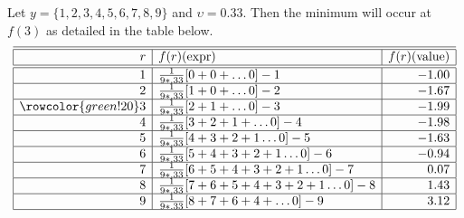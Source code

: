 Let $y =\{1,2,3,4,5,6,7,8,9\}$ and  $\upsilon = 0.33$. Then the minimum will occur at $f(3)$ as detailed in
the table below.
\[
\begin{array}{|r|l|r|}  \hline \hline
r & f(r) (\mbox{expr}) & f(r) (\mbox{value}) \\ \hline \hline
1 & \frac{1}{9*.33}[0 + 0 +\ldots 0] - 1 & -1.00 \\ \hline
2 & \frac{1}{9*.33}[1 + 0 +\ldots 0] - 2 & -1.67 \\ \hline
\rowcolor{green!20}
3 & \frac{1}{9*.33}[2 + 1 +\ldots 0] - 3 & -1.99  \\ \hline
4 & \frac{1}{9*.33}[3 + 2 + 1 +\ldots 0] - 4 & -1.98  \\ \hline
5 & \frac{1}{9*.33}[4 + 3 + 2 + 1\ldots 0] - 5 & -1.63  \\ \hline
6 & \frac{1}{9*.33}[5 + 4  + 3 + 2 + 1\ldots 0] - 6 & -0.94  \\ \hline
7 & \frac{1}{9*.33}[6 + 5  + 4 + 3 + 2 + 1\ldots 0] - 7 & 0.07  \\ \hline
8 & \frac{1}{9*.33}[7 + 6  + 5 + 4 + 3 + 2 + 1\ldots 0] - 8 & 1.43  \\ \hline
9 & \frac{1}{9*.33}[8 + 7  + 6 + 4 + \ldots 0] - 9 & 3.12  \\ \hline
\end{array}
\]


